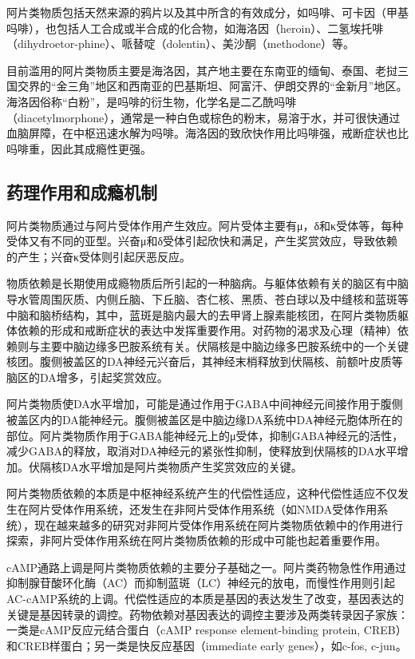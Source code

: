 阿片类物质包括天然来源的鸦片以及其中所含的有效成分，如吗啡、可卡因（甲基吗啡），也包括人工合成或半合成的化合物，如海洛因（heroin）、二氢埃托啡（dihydroetor-phine）、哌替啶（dolentin）、美沙酮（methodone）等。

目前滥用的阿片类物质主要是海洛因，其产地主要在东南亚的缅甸、泰国、老挝三国交界的``金三角''地区和西南亚的巴基斯坦、阿富汗、伊朗交界的``金新月''地区。海洛因俗称``白粉''，是吗啡的衍生物，化学名是二乙酰吗啡（diacetylmorphone），通常是一种白色或棕色的粉末，易溶于水，并可很快通过血脑屏障，在中枢迅速水解为吗啡。海洛因的致欣快作用比吗啡强，戒断症状也比吗啡重，因此其成瘾性更强。

\subsection{药理作用和成瘾机制}

阿片类物质通过与阿片受体作用产生效应。阿片受体主要有μ，δ和κ受体等，每种受体又有不同的亚型。兴奋μ和δ受体引起欣快和满足，产生奖赏效应，导致依赖的产生；兴奋κ受体则引起厌恶反应。

物质依赖是长期使用成瘾物质后所引起的一种脑病。与躯体依赖有关的脑区有中脑导水管周围灰质、内侧丘脑、下丘脑、杏仁核、黑质、苍白球以及中缝核和蓝斑等中脑和脑桥结构，其中，蓝斑是脑内最大的去甲肾上腺素能核团，在阿片类物质躯体依赖的形成和戒断症状的表达中发挥重要作用。对药物的渴求及心理（精神）依赖则与主要中脑边缘多巴胺系统有关。伏隔核是中脑边缘多巴胺系统中的一个关键核团。腹侧被盖区的DA神经元兴奋后，其神经末梢释放到伏隔核、前额叶皮质等脑区的DA增多，引起奖赏效应。

阿片类物质使DA水平增加，可能是通过作用于GABA中间神经元间接作用于腹侧被盖区内的DA能神经元。腹侧被盖区是中脑边缘DA系统中DA神经元胞体所在的部位。阿片类物质作用于GABA能神经元上的μ受体，抑制GABA神经元的活性，减少GABA的释放，取消对DA神经元的紧张性抑制，使释放到伏隔核的DA水平增加。伏隔核DA水平增加是阿片类物质产生奖赏效应的关键。

阿片类物质依赖的本质是中枢神经系统产生的代偿性适应，这种代偿性适应不仅发生在阿片受体作用系统，还发生在非阿片受体作用系统（如NMDA受体作用系统），现在越来越多的研究对非阿片受体作用系统在阿片类物质依赖中的作用进行探索，非阿片受体作用系统在阿片类物质依赖的形成中可能也起着重要作用。

cAMP通路上调是阿片类物质依赖的主要分子基础之一。阿片类药物急性作用通过抑制腺苷酸环化酶（AC）而抑制蓝斑（LC）神经元的放电，而慢性作用则引起AC-cAMP系统的上调。代偿性适应的本质是基因的表达发生了改变，基因表达的关键是基因转录的调控。药物依赖对基因表达的调控主要涉及两类转录因子家族：一类是cAMP反应元结合蛋白（cAMP
response element-binding protein,
CREB）和CREB样蛋白；另一类是快反应基因（immediate early
genes），如c-fos, c-jun。

